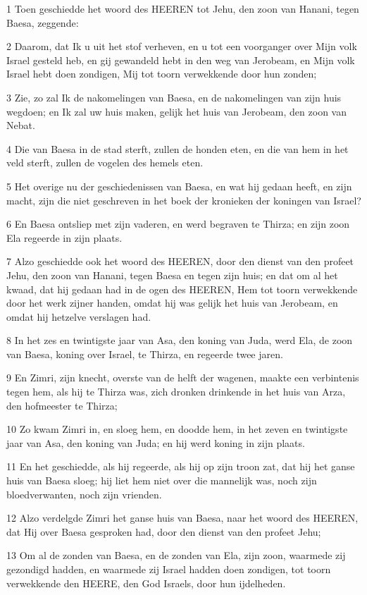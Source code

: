 \par 1 Toen geschiedde het woord des HEEREN tot Jehu, den zoon van Hanani, tegen Baesa, zeggende:
\par 2 Daarom, dat Ik u uit het stof verheven, en u tot een voorganger over Mijn volk Israel gesteld heb, en gij gewandeld hebt in den weg van Jerobeam, en Mijn volk Israel hebt doen zondigen, Mij tot toorn verwekkende door hun zonden;
\par 3 Zie, zo zal Ik de nakomelingen van Baesa, en de nakomelingen van zijn huis wegdoen; en Ik zal uw huis maken, gelijk het huis van Jerobeam, den zoon van Nebat.
\par 4 Die van Baesa in de stad sterft, zullen de honden eten, en die van hem in het veld sterft, zullen de vogelen des hemels eten.
\par 5 Het overige nu der geschiedenissen van Baesa, en wat hij gedaan heeft, en zijn macht, zijn die niet geschreven in het boek der kronieken der koningen van Israel?
\par 6 En Baesa ontsliep met zijn vaderen, en werd begraven te Thirza; en zijn zoon Ela regeerde in zijn plaats.
\par 7 Alzo geschiedde ook het woord des HEEREN, door den dienst van den profeet Jehu, den zoon van Hanani, tegen Baesa en tegen zijn huis; en dat om al het kwaad, dat hij gedaan had in de ogen des HEEREN, Hem tot toorn verwekkende door het werk zijner handen, omdat hij was gelijk het huis van Jerobeam, en omdat hij hetzelve verslagen had.
\par 8 In het zes en twintigste jaar van Asa, den koning van Juda, werd Ela, de zoon van Baesa, koning over Israel, te Thirza, en regeerde twee jaren.
\par 9 En Zimri, zijn knecht, overste van de helft der wagenen, maakte een verbintenis tegen hem, als hij te Thirza was, zich dronken drinkende in het huis van Arza, den hofmeester te Thirza;
\par 10 Zo kwam Zimri in, en sloeg hem, en doodde hem, in het zeven en twintigste jaar van Asa, den koning van Juda; en hij werd koning in zijn plaats.
\par 11 En het geschiedde, als hij regeerde, als hij op zijn troon zat, dat hij het ganse huis van Baesa sloeg; hij liet hem niet over die mannelijk was, noch zijn bloedverwanten, noch zijn vrienden.
\par 12 Alzo verdelgde Zimri het ganse huis van Baesa, naar het woord des HEEREN, dat Hij over Baesa gesproken had, door den dienst van den profeet Jehu;
\par 13 Om al de zonden van Baesa, en de zonden van Ela, zijn zoon, waarmede zij gezondigd hadden, en waarmede zij Israel hadden doen zondigen, tot toorn verwekkende den HEERE, den God Israels, door hun ijdelheden.

